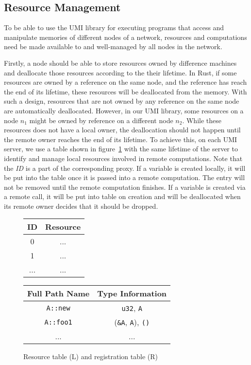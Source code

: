 \subsection{Resource Management}
\label{chap3:impl:resource}
To be able to use the UMI library for executing programs that access and manipulate memories of different nodes of a network, resources and computations need be made available to and well-managed by all nodes in the network.

Firstly, a node should be able to store resources owned by difference machines and deallocate those resources according to the their lifetime.
In Rust, if some resources are owned by a reference on the same node, and the reference has reach the end of its lifetime, these resources will be deallocated from the memory. With such a design, resources that are not owned by any reference on the same node are automatically deallocated. However, in our UMI library, some resources on a node $n_1$ might be owned by reference on a different node $n_2$. While these resources does not have a local owner, the deallocation should not happen until the remote owner reaches the end of its lifetime. To achieve this, on each UMI server, we use a table shown in figure~\ref{chap3:impl:tables} with the same lifetime of the server to identify and manage local resources involved in remote computations. Note that the \textit{ID} is a part of the corresponding proxy.
If a variable is created locally, it will be put into the table once it is passed into a remote computation. The entry will not be removed until the remote computation finishes. If a variable is created via a remote call, it will be put into table on creation and will be deallocated when its remote owner decides that it should be dropped.
\begin{figure}
\centering
\begin{tabular}{ |c|c| } 
\hline
\textbf{ID} & \textbf{Resource} \\\hline
0 & ... \\\hline
1 & ... \\\hline
... & ... \\
\hline
\end{tabular}
\quad
\begin{tabular}{ |c|c| } 
\hline
\textbf{Full Path Name} & \textbf{Type Information} \\\hline
\texttt{A::new} & \texttt{u32}, \texttt{A} \\\hline
\texttt{A::foo1} &  (\texttt{\&A}, \texttt{A}), \texttt{()} \\\hline
... & ... \\
\hline
\end{tabular}
\caption{Resource table (L) and registration table (R)}
\label{chap3:impl:tables}
\end{figure}

